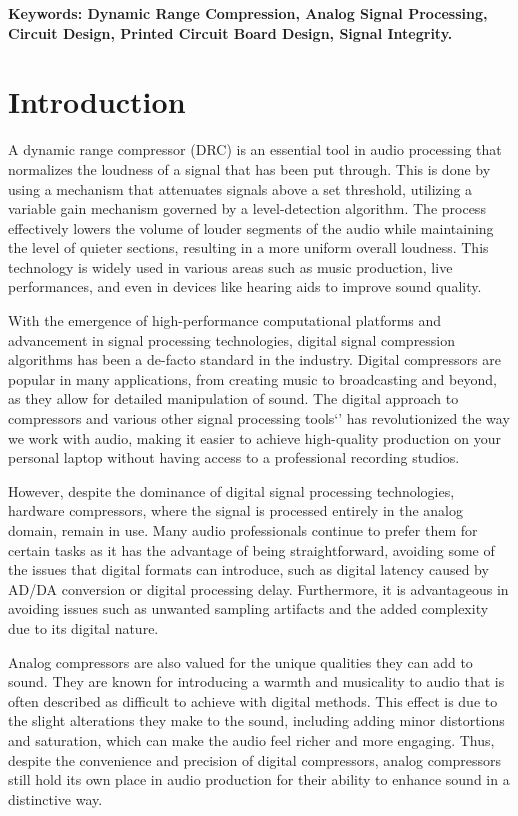 \documentclass[10pt]{article}
\begin{document}
    \begin{multicols*}{2}

        \textbf{
            Keywords: 
            Dynamic Range Compression, Analog Signal Processing, Circuit Design, Printed Circuit Board Design, Signal Integrity.
        }

        \section{Introduction}
            A dynamic range compressor (DRC) is an essential tool in audio processing that normalizes the loudness of a signal that has been put through. This is done by using a mechanism that attenuates signals above a set threshold, utilizing a variable gain mechanism governed by a level-detection algorithm. The process effectively lowers the volume of louder segments of the audio while maintaining the level of quieter sections, resulting in a more uniform overall loudness. This technology is widely used in various areas such as music production, live performances, and even in devices like hearing aids to improve sound quality.\par
            With the emergence of high-performance computational platforms and advancement in signal processing technologies, digital signal compression algorithms has been a de-facto standard in the industry. Digital compressors are popular in many applications, from creating music to broadcasting and beyond, as they allow for detailed manipulation of sound. The digital approach to compressors and various other signal processing tools`' has revolutionized the way we work with audio, making it easier to achieve high-quality production on your personal laptop without having access to a professional recording studios.\par
            However, despite the dominance of digital signal processing technologies, hardware compressors, where the signal is processed entirely in the analog domain, remain in use. Many audio professionals continue to prefer them for certain tasks as it has the advantage of being straightforward, avoiding some of the issues that digital formats can introduce, such as digital latency caused by AD/DA conversion or digital processing delay. Furthermore, it is advantageous in avoiding issues such as unwanted sampling artifacts and the added complexity due to its digital nature.\par
            Analog compressors are also valued for the unique qualities they can add to sound. They are known for introducing a warmth and musicality to audio that is often described as difficult to achieve with digital methods. This effect is due to the slight alterations they make to the sound, including adding minor distortions and saturation, which can make the audio feel richer and more engaging. Thus, despite the convenience and precision of digital compressors, analog compressors still hold its own place in audio production for their ability to enhance sound in a distinctive way.\par

\end{multicols*}
\end{document}
